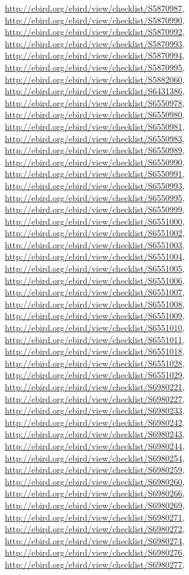 \documentclass[9pt, article]{memoir}
\begin{document}
\begin{multicols}{2}
\url{http://ebird.org/ebird/view/checklist/S5870987}, 
\url{http://ebird.org/ebird/view/checklist/S5870990}, 
\url{http://ebird.org/ebird/view/checklist/S5870992}, 
\url{http://ebird.org/ebird/view/checklist/S5870993}, 
\url{http://ebird.org/ebird/view/checklist/S5870994}, 
\url{http://ebird.org/ebird/view/checklist/S5870995}, 
\url{http://ebird.org/ebird/view/checklist/S5882060}, 
\url{http://ebird.org/ebird/view/checklist/S6431386}, 
\url{http://ebird.org/ebird/view/checklist/S6550978}, 
\url{http://ebird.org/ebird/view/checklist/S6550980}, 
\url{http://ebird.org/ebird/view/checklist/S6550981}, 
\url{http://ebird.org/ebird/view/checklist/S6550983}, 
\url{http://ebird.org/ebird/view/checklist/S6550989}, 
\url{http://ebird.org/ebird/view/checklist/S6550990}, 
\url{http://ebird.org/ebird/view/checklist/S6550991}, 
\url{http://ebird.org/ebird/view/checklist/S6550993}, 
\url{http://ebird.org/ebird/view/checklist/S6550995}, 
\url{http://ebird.org/ebird/view/checklist/S6550999}, 
\url{http://ebird.org/ebird/view/checklist/S6551000}, 
\url{http://ebird.org/ebird/view/checklist/S6551002}, 
\url{http://ebird.org/ebird/view/checklist/S6551003}, 
\url{http://ebird.org/ebird/view/checklist/S6551004}, 
\url{http://ebird.org/ebird/view/checklist/S6551005}, 
\url{http://ebird.org/ebird/view/checklist/S6551006}, 
\url{http://ebird.org/ebird/view/checklist/S6551007}, 
\url{http://ebird.org/ebird/view/checklist/S6551008}, 
\url{http://ebird.org/ebird/view/checklist/S6551009}, 
\url{http://ebird.org/ebird/view/checklist/S6551010}, 
\url{http://ebird.org/ebird/view/checklist/S6551011}, 
\url{http://ebird.org/ebird/view/checklist/S6551018}, 
\url{http://ebird.org/ebird/view/checklist/S6551028}, 
\url{http://ebird.org/ebird/view/checklist/S6551029}, 
\url{http://ebird.org/ebird/view/checklist/S6980221}, 
\url{http://ebird.org/ebird/view/checklist/S6980227}, 
\url{http://ebird.org/ebird/view/checklist/S6980233}, 
\url{http://ebird.org/ebird/view/checklist/S6980242}, 
\url{http://ebird.org/ebird/view/checklist/S6980243}, 
\url{http://ebird.org/ebird/view/checklist/S6980244}, 
\url{http://ebird.org/ebird/view/checklist/S6980254}, 
\url{http://ebird.org/ebird/view/checklist/S6980259}, 
\url{http://ebird.org/ebird/view/checklist/S6980260}, 
\url{http://ebird.org/ebird/view/checklist/S6980266}, 
\url{http://ebird.org/ebird/view/checklist/S6980269}, 
\url{http://ebird.org/ebird/view/checklist/S6980271}, 
\url{http://ebird.org/ebird/view/checklist/S6980272}, 
\url{http://ebird.org/ebird/view/checklist/S6980274}, 
\url{http://ebird.org/ebird/view/checklist/S6980276}, 
\url{http://ebird.org/ebird/view/checklist/S6980277}, 

\end{multicols}
\end{document}
